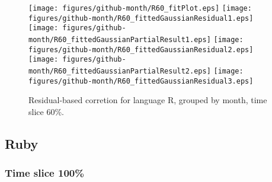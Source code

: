 \begin{figure}[hb]
\centering
{}
{\texttt{[image: figures/github-month/R60\_fitPlot.eps]}}
{\texttt{[image: figures/github-month/R60\_fittedGaussianResidual1.eps]}}
{\texttt{[image: figures/github-month/R60\_fittedGaussianPartialResult1.eps]}}
{\texttt{[image: figures/github-month/R60\_fittedGaussianResidual2.eps]}}
{\texttt{[image: figures/github-month/R60\_fittedGaussianPartialResult2.eps]}}
{\texttt{[image: figures/github-month/R60\_fittedGaussianResidual3.eps]}}
\caption{Residual-based corretion for language R, grouped by month, time slice 60\%.}
\end{figure}


\clearpage 
\newpage 


\subsection{Ruby}

\FloatBarrier

\subsubsection{Time slice 100\%}

